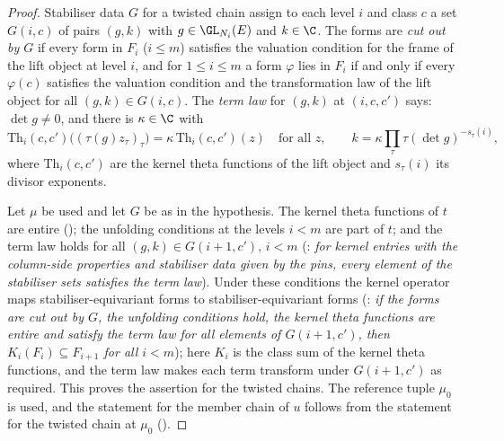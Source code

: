 \begin{proof}
Stabiliser data $G$ for a twisted chain assign to each level $i$ and class $c$ a set $G(i,c)$ of pairs $(g,k)$ with
$g\in\GL_{N_i}(E)$ and $k\in\C$. The forms are \emph{cut out by $G$} if every form in $F_i$ ($i\le m$) satisfies the
valuation condition for the frame of the lift object at level $i$, and for $1\le i\le m$ a form $\varphi$ lies in $F_i$
if and only if every $\varphi(c)$ satisfies the valuation condition and the transformation law of the lift object for all
$(g,k)\in G(i,c)$. The \emph{term law} for $(g,k)$ at $(i,c,c')$ says: $\det g\ne0$, and there is $\kappa\in\C$ with
\[
\mathrm{Th}_i(c,c')\bigl((\tau(g)z_\tau)_\tau\bigr)=\kappa\,\mathrm{Th}_i(c,c')(z)\quad\text{for all }z,\qquad
k=\kappa\prod_\tau\tau(\det g)^{-s_\tau(i)},
\]
where $\mathrm{Th}_i(c,c')$ are the kernel theta functions of the lift object and $s_\tau(i)$ its divisor exponents.

Let $\mu$ be used and let $G$ be as in the hypothesis. The kernel theta functions of $t$ are entire
(); the unfolding conditions at the levels $i<m$ are part of $t$; and
the term law holds for all $(g,k)\in G(i+1,c')$, $i<m$ (:
\emph{for kernel entries with the column-side properties and stabiliser data given by the pins, every element of the
stabiliser sets satisfies the term law}). Under these conditions the kernel operator maps stabiliser-equivariant forms to
stabiliser-equivariant forms (: \emph{if the
forms are cut out by $G$, the unfolding conditions hold, the kernel theta functions are entire and satisfy the term law
for all elements of $G(i+1,c')$, then $K_i(F_i)\subseteq F_{i+1}$ for all $i<m$}); here $K_i$ is the class sum of the
kernel theta functions, and the term law makes each term transform under $G(i+1,c')$ as required. This proves the
assertion for the twisted chains. The reference tuple $\mu_0$ is used, and the statement for the member chain of $u$
follows from the statement for the twisted chain at $\mu_0$
().
\end{proof}


